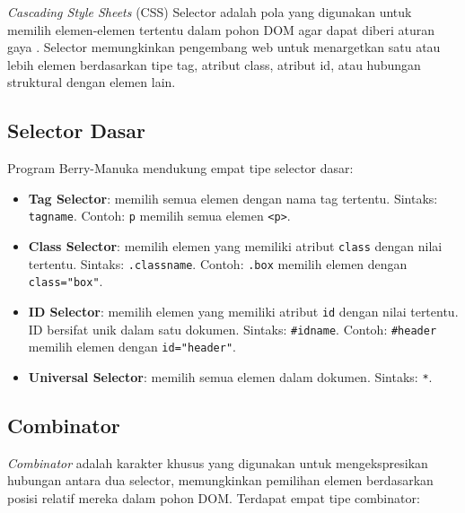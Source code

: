 \textit{Cascading Style Sheets} (CSS) Selector adalah pola yang digunakan untuk
memilih elemen-elemen tertentu dalam pohon DOM agar dapat diberi aturan gaya
\cite{mdn_css_selectors}. Selector memungkinkan pengembang web untuk menargetkan
satu atau lebih elemen berdasarkan tipe tag, atribut class, atribut id, atau
hubungan struktural dengan elemen lain.

\subsection{Selector Dasar}

Program Berry-Manuka mendukung empat tipe selector dasar:

\begin{itemize}
    \item \textbf{Tag Selector}: memilih semua elemen dengan nama tag tertentu.
    Sintaks: \texttt{tagname}. Contoh: \texttt{p} memilih semua elemen \texttt{<p>}.
    
    \item \textbf{Class Selector}: memilih elemen yang memiliki atribut \texttt{class}
    dengan nilai tertentu. Sintaks: \texttt{.classname}. Contoh: \texttt{.box}
    memilih elemen dengan \texttt{class="box"}.
    
    \item \textbf{ID Selector}: memilih elemen yang memiliki atribut \texttt{id}
    dengan nilai tertentu. ID bersifat unik dalam satu dokumen. Sintaks:
    \texttt{\#idname}. Contoh: \texttt{\#header} memilih elemen dengan
    \texttt{id="header"}.
    
    \item \textbf{Universal Selector}: memilih semua elemen dalam dokumen.
    Sintaks: \texttt{*}.
\end{itemize}

\subsection{Combinator}

\textit{Combinator} adalah karakter khusus yang digunakan untuk mengekspresikan
hubungan antara dua selector, memungkinkan pemilihan elemen berdasarkan posisi
relatif mereka dalam pohon DOM. Terdapat empat tipe combinator:

